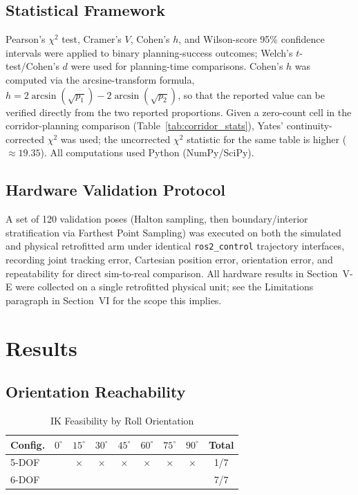 \documentclass[conference]{IEEEtran}
\begin{document}
	\subsection{Statistical Framework}
	
	Pearson's $\chi^2$ test, Cramer's $V$, Cohen's $h$, and Wilson-score
	95\% confidence intervals were applied to binary planning-success
	outcomes; Welch's $t$-test/Cohen's $d$ were used for planning-time
	comparisons. Cohen's $h$ was computed via the arcsine-transform
	formula, $h = 2\arcsin(\sqrt{p_1}) - 2\arcsin(\sqrt{p_2})$, so that
	the reported value can be verified directly from the two reported
	proportions. Given a zero-count cell in the corridor-planning
	comparison (Table~\ref{tab:corridor_stats}), Yates' continuity-corrected
	$\chi^2$ was used; the uncorrected $\chi^2$ statistic for the same
	table is higher (${\approx}19.35$). All computations used Python
	(NumPy/SciPy).
	
	\subsection{Hardware Validation Protocol}
	
	A set of 120 validation poses (Halton sampling, then boundary/interior
	stratification via Farthest Point Sampling) was executed on both the
	simulated and physical retrofitted arm under identical
	\texttt{ros2\_control} trajectory interfaces, recording joint
	tracking error, Cartesian position error, orientation error, and
	repeatability for direct sim-to-real comparison. All hardware
	results in Section~V-E were collected on a single retrofitted
	physical unit; see the Limitations paragraph in Section~VI for the
	scope this implies.
	
	\section{Results}
	\label{sec:results}
	
	\subsection{Orientation Reachability}
	
	\begin{table}[t]
		\centering
		\caption{IK Feasibility by Roll Orientation}
		\label{tab:ik}
		\small
		\begin{tabular}{lcccccccc}
			\toprule
			\textbf{Config.} & $0^\circ$ & $15^\circ$ & $30^\circ$ & $45^\circ$ & $60^\circ$ & $75^\circ$ & $90^\circ$ & \textbf{Total} \\
			\midrule
			5-DOF & \checkmark & $\times$ & $\times$ & $\times$ & $\times$ & $\times$ & $\times$ & 1/7 \\
			6-DOF & \checkmark & \checkmark & \checkmark & \checkmark & \checkmark & \checkmark & \checkmark & 7/7 \\
			\bottomrule
		\end{tabular}
	\end{table}
	
\end{document}
